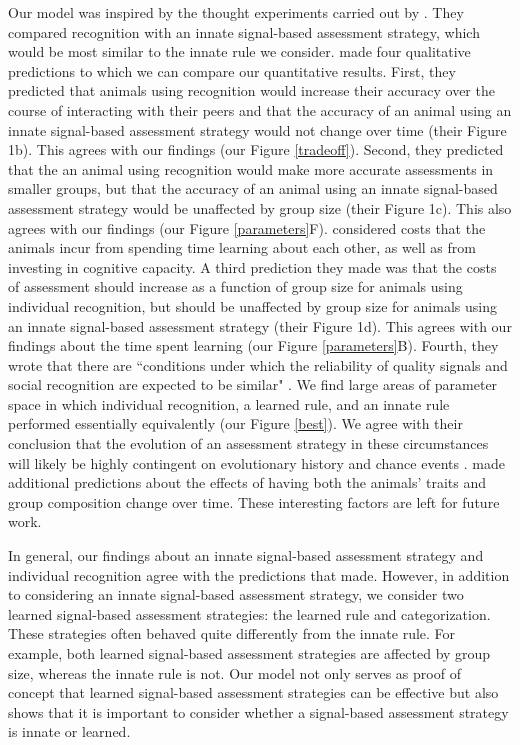 Our model was inspired by the thought experiments carried out by \citet{sheehan2016evotradeoff}. They compared recognition with an innate signal-based assessment strategy, which would be most similar to the innate rule we consider. \citet{sheehan2016evotradeoff} made four qualitative predictions to which we can compare our quantitative results. First, they predicted that animals using recognition would increase their accuracy over the course of interacting with their peers and that the accuracy of an animal using an innate signal-based assessment strategy would not change over time (their Figure 1b). This agrees with our findings (our Figure \ref{tradeoff}).  Second, they predicted that the an animal using recognition would make more accurate assessments in smaller groups, but that the accuracy of an animal using an innate signal-based assessment strategy would be unaffected by group size (their Figure 1c). This also agrees with our findings (our Figure \ref{parameters}F). \citet{sheehan2016evotradeoff} considered costs that the animals incur from spending time learning about each other, as well as from investing in cognitive capacity. A third prediction they made was that the costs of assessment should increase as a function of group size for animals using individual recognition, but should be unaffected by group size for animals using an innate signal-based assessment strategy (their Figure 1d). This agrees with our findings about the time spent learning (our Figure \ref{parameters}B). Fourth, they wrote that there are ``conditions under which the reliability of quality signals and social recognition are expected to be similar" \citep{sheehan2016evotradeoff}. We find large areas of parameter space in which individual recognition, a learned rule, and an innate rule performed essentially equivalently (our Figure \ref{best}). We agree with their conclusion that the evolution of an assessment strategy in these circumstances will likely be highly contingent on evolutionary history and chance events \citep{sheehan2016evotradeoff}. \citet{sheehan2016evotradeoff} made additional predictions about the effects of having both the animals' traits and group composition change over time. These interesting factors are left for future work.

In general, our findings about an innate signal-based assessment strategy and individual recognition agree with the predictions that \citet{sheehan2016evotradeoff} made. However, in addition to considering an innate signal-based assessment strategy, we consider two learned signal-based assessment strategies: the learned rule and categorization. These strategies often behaved quite differently from the innate rule. For example, both learned signal-based assessment strategies are affected by group size, whereas the innate rule is not. Our model not only serves as proof of concept that learned signal-based assessment strategies can be effective but also shows that it is important to consider whether a signal-based assessment strategy is innate or learned.

